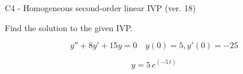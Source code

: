 \begin{exercise}
  \begin{exerciseTitle}C4 - Homogeneous second-order linear IVP (ver. 18)\end{exerciseTitle}
  \begin{exerciseStatement}
    
Find the solution to the given IVP.

    
\[y''+8y'+15y = 0 \hspace{1em} y(0) = 5 , y'(0) = -25\]

  \end{exerciseStatement}
  \begin{exerciseAnswer}
    
\[y= 5 \, e^{\left(-5 \, t\right)}\]

  \end{exerciseAnswer}
\end{exercise}
